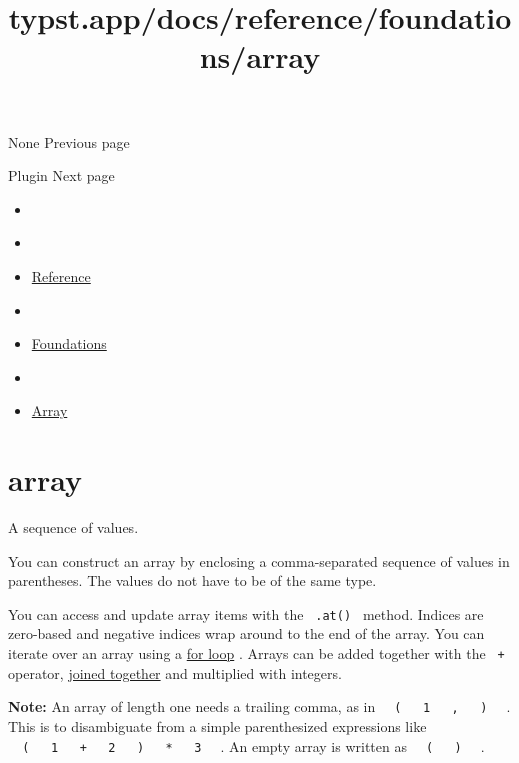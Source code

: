 { None } { Previous page }

\href{/docs/reference/foundations/plugin/}{\pandocbounded{}}

{ Plugin } { Next page }


\title{typst.app/docs/reference/foundations/array}

\begin{itemize}
\tightlist
\item
  \href{/docs}{}
\item
  
\item
  \href{/docs/reference/}{Reference}
\item
  
\item
  \href{/docs/reference/foundations/}{Foundations}
\item
  
\item
  \href{/docs/reference/foundations/array/}{Array}
\end{itemize}

\section{\texorpdfstring{{ array }}{ array }}\label{summary}

A sequence of values.

You can construct an array by enclosing a comma-separated sequence of
values in parentheses. The values do not have to be of the same type.

You can access and update array items with the \texttt{\ .at()\ }
method. Indices are zero-based and negative indices wrap around to the
end of the array. You can iterate over an array using a
\href{/docs/reference/scripting/\#loops}{for loop} . Arrays can be added
together with the \texttt{\ +\ } operator,
\href{/docs/reference/scripting/\#blocks}{joined together} and
multiplied with integers.

\textbf{Note:} An array of length one needs a trailing comma, as in
\texttt{\ }{\texttt{\ (\ }}\texttt{\ }{\texttt{\ 1\ }}\texttt{\ }{\texttt{\ ,\ }}\texttt{\ }{\texttt{\ )\ }}\texttt{\ }
. This is to disambiguate from a simple parenthesized expressions like
\texttt{\ }{\texttt{\ (\ }}\texttt{\ }{\texttt{\ 1\ }}\texttt{\ }{\texttt{\ +\ }}\texttt{\ }{\texttt{\ 2\ }}\texttt{\ }{\texttt{\ )\ }}\texttt{\ }{\texttt{\ *\ }}\texttt{\ }{\texttt{\ 3\ }}\texttt{\ }
. An empty array is written as
\texttt{\ }{\texttt{\ (\ }}\texttt{\ }{\texttt{\ )\ }}\texttt{\ } .

